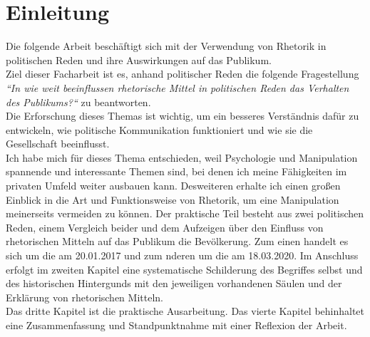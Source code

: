 \section{Einleitung}
\label{sec:Einleitung}

Die folgende Arbeit beschäftigt sich mit der Verwendung von Rhetorik in 
politischen Reden und ihre Auswirkungen auf das Publikum. \\Ziel dieser Facharbeit 
ist es, anhand politischer Reden die folgende Fragestellung \textit{“In wie weit 
beeinflussen rhetorische Mittel in politischen Reden das Verhalten des 
Publikums?“} zu beantworten. \\Die Erforschung dieses Themas ist wichtig, um ein 
besseres Verständnis dafür zu entwickeln, wie politische Kommunikation 
funktioniert und wie sie die Gesellschaft beeinflusst. \\Ich habe mich für dieses 
Thema entschieden, weil Psychologie und Manipulation spannende und interessante Themen sind, 
bei denen ich meine Fähigkeiten im privaten Umfeld weiter ausbauen kann. 
Desweiteren erhalte ich einen großen Einblick in die Art und Funktionsweise von 
Rhetorik, um eine Manipulation meinerseits vermeiden zu können. 
Der praktische Teil besteht aus zwei politischen Reden, einem Vergleich beider 
und dem Aufzeigen über den Einfluss von rhetorischen Mitteln auf das Publikum \bzw die Bevölkerung.
Zum einen handelt es sich um die  am
20.01.2017 und zum nderen um die  am 18.03.2020. 
Im Anschluss erfolgt im zweiten Kapitel  eine systematische 
Schilderung des Begriffes selbst und des historischen Hintergunds mit den 
jeweiligen vorhandenen Säulen und der Erklärung von rhetorischen Mitteln. 
\\Das dritte Kapitel  ist die praktische 
Ausarbeitung. Das vierte Kapitel  
behinhaltet eine Zusammenfassung und Standpunktnahme mit einer Reflexion der Arbeit.
\cleardoublepage